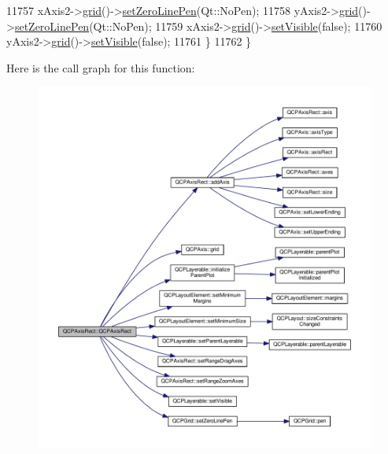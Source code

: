 \begin{DoxyCode}
11757     xAxis2->\hyperlink{class_q_c_p_axis_ac4fb913cce3072b5e75a4635e0f6cd04}{grid}()->\hyperlink{class_q_c_p_grid_a209f40fdb252397b418b82d3494d8ea0}{setZeroLinePen}(Qt::NoPen);
11758     yAxis2->\hyperlink{class_q_c_p_axis_ac4fb913cce3072b5e75a4635e0f6cd04}{grid}()->\hyperlink{class_q_c_p_grid_a209f40fdb252397b418b82d3494d8ea0}{setZeroLinePen}(Qt::NoPen);
11759     xAxis2->\hyperlink{class_q_c_p_axis_ac4fb913cce3072b5e75a4635e0f6cd04}{grid}()->\hyperlink{class_q_c_p_layerable_a3bed99ddc396b48ce3ebfdc0418744f8}{setVisible}(\textcolor{keyword}{false});
11760     yAxis2->\hyperlink{class_q_c_p_axis_ac4fb913cce3072b5e75a4635e0f6cd04}{grid}()->\hyperlink{class_q_c_p_layerable_a3bed99ddc396b48ce3ebfdc0418744f8}{setVisible}(\textcolor{keyword}{false});
11761   \}
11762 \}
\end{DoxyCode}


Here is the call graph for this function\+:\nopagebreak
\begin{figure}[H]
\begin{center}
\leavevmode
\includegraphics[width=350pt]{class_q_c_p_axis_rect_a60b31dece805462c1b82eea2e69ba042_cgraph}
\end{center}
\end{figure}


\hypertarget{class_q_c_p_axis_rect_a463c44b1856ddbf82eb3f7b582839cd0}{}
